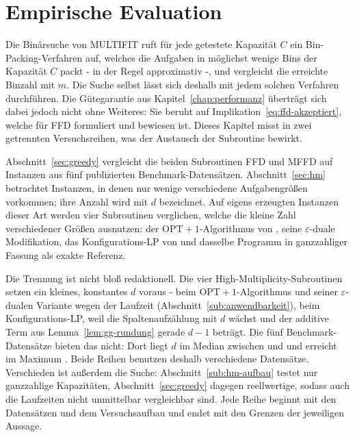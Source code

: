 \chapter{Empirische Evaluation}
\label{chap:evaluation}

Die Binärsuche von MULTIFIT ruft für jede getestete Kapazität $C$ ein Bin-Packing-Verfahren auf,
welches die Aufgaben in möglichst wenige Bins der Kapazität $C$ packt - in der Regel
approximativ -, und vergleicht die erreichte Binzahl mit $m$.
Die Suche selbst lässt sich deshalb mit jedem solchen Verfahren durchführen.
Die Gütegarantie aus Kapitel~\ref{chap:performanz} überträgt sich dabei jedoch nicht ohne
Weiteres: Sie beruht auf Implikation~\eqref{eq:ffd-akzeptiert}, welche für FFD formuliert und
bewiesen ist.
Dieses Kapitel misst in zwei getrennten Versuchsreihen, was der Austausch der Subroutine bewirkt.

Abschnitt~\ref{sec:greedy} vergleicht die beiden Subroutinen FFD und MFFD auf
\EvalInstanzen{} Instanzen aus fünf publizierten Benchmark-Datensätzen.
Abschnitt~\ref{sec:hm} betrachtet Instanzen, in denen nur wenige verschiedene Aufgabengrößen
vorkommen; ihre Anzahl wird mit $d$ bezeichnet.
Auf \HmInstanzen{} eigens erzeugten Instanzen dieser Art werden vier Subroutinen verglichen,
welche die kleine Zahl verschiedener Größen ausnutzen: der $\mathrm{OPT}+1$-Algorithmus von
\textcite{jansen_solisoba2010}, seine $\varepsilon$-duale Modifikation, das Konfigurations-LP
von \textcite{gilmore_gomory1961} und dasselbe Programm in ganzzahliger Fassung als exakte
Referenz.

Die Trennung ist nicht bloß redaktionell.
Die vier High-Multiplicity-Subroutinen setzen ein kleines, konstantes $d$ voraus - beim
$\mathrm{OPT}+1$-Algorithmus und seiner $\varepsilon$-dualen Variante wegen der Laufzeit
(Abschnitt~\ref{sub:anwendbarkeit}), beim Konfigurations-LP, weil die Spaltenaufzählung mit $d$
wächst und der additive Term aus Lemma~\ref{lem:gg-rundung} gerade $d-1$ beträgt.
Die fünf Benchmark-Datensätze bieten das nicht: Dort
liegt $d$ im Median zwischen \HmDBenchMedianMin{} und \HmDBenchMedianMax{} und erreicht im
Maximum \HmDBenchMax.
Beide Reihen benutzen deshalb verschiedene Datensätze.
Verschieden ist außerdem die Suche: Abschnitt~\ref{sub:hm-aufbau} testet nur ganzzahlige
Kapazitäten, Abschnitt~\ref{sec:greedy} dagegen reellwertige, sodass auch die Laufzeiten nicht
unmittelbar vergleichbar sind.
Jede Reihe beginnt mit
den Datensätzen und dem Versuchsaufbau und endet mit den Grenzen der jeweiligen Aussage.


